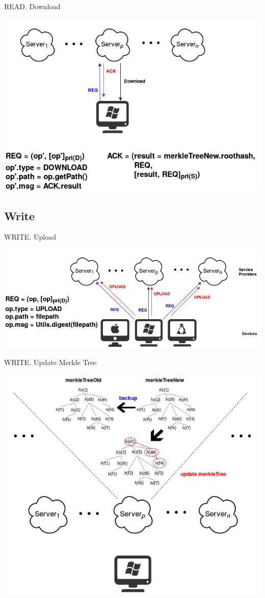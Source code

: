 \documentclass{beamer}
\newcommand{\RNum}[1]{\uppercase\expandafter{\romannumeral #1\relax}}
\begin{document}
\begin{frame}{READ}{\RNum{3}. Download}
	\begin{center}
	\includegraphics[width=.85\textwidth]{Read3.png}
	\end{center}
\end{frame}

\subsection{Write}
\begin{frame}{WRITE}{\RNum{1}. Upload}
	\begin{center}
	\includegraphics[width=.95\textwidth]{Write1.png}
	\end{center}
\end{frame}

\begin{frame}{WRITE}{\RNum{2}. Update Merkle Tree}
	\begin{center}
	\includegraphics[width=.65\textwidth]{Write2.png}
	\end{center}
\end{frame}
\end{document}
